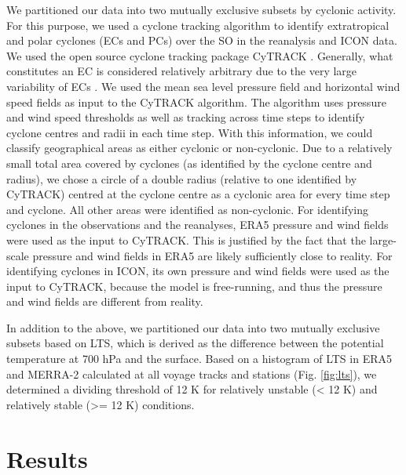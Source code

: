 \documentclass[12pt,a4paper]{article}
\begin{document}
We partitioned our data into two mutually exclusive subsets by cyclonic
activity. For this purpose, we used a cyclone tracking algorithm to identify
extratropical and polar cyclones (ECs and PCs) over the SO in the reanalysis
and ICON data. We used the open source cyclone tracking package CyTRACK
\citep{perez-alarcon2024}.  Generally, what constitutes an EC is considered
relatively arbitrary due to the very large variability of ECs \citep{neu2013}.
We used the mean sea level pressure field and horizontal wind speed fields as
input to the CyTRACK algorithm. The algorithm uses pressure and wind speed
thresholds as well as tracking across time steps to identify cyclone centres
and radii in each time step. With this information, we could classify geographical areas as
either cyclonic or non-cyclonic. Due to a relatively small total area covered by cyclones (as identified by the cyclone centre and radius),
we chose a circle of a double radius (relative to one identified by CyTRACK)
centred at the cyclone centre as a cyclonic area for every time step and
cyclone. All other areas were identified as non-cyclonic. For identifying
cyclones in the observations and the reanalyses, ERA5 pressure and wind fields
were used as the input to CyTRACK.  This is justified by the fact that the
large-scale pressure and wind fields in ERA5 are likely sufficiently close to
reality. For identifying cyclones in ICON, its own pressure and wind fields
were used as the input to CyTRACK, because the model is free-running, and thus
the pressure and wind fields are different from reality.

In addition to the above, we partitioned our data into two mutually exclusive
subsets based on LTS, which is derived as the difference between the potential temperature at 700 hPa
and the surface.  Based on a histogram of LTS in ERA5 and MERRA-2 calculated at
all voyage tracks and stations (Fig.  \ref{fig:lts}), we determined a dividing
threshold of 12 K for relatively unstable (< 12 K) and relatively stable (>= 12
K) conditions.

\section{Results}
\label{sec:results}
\end{document}
